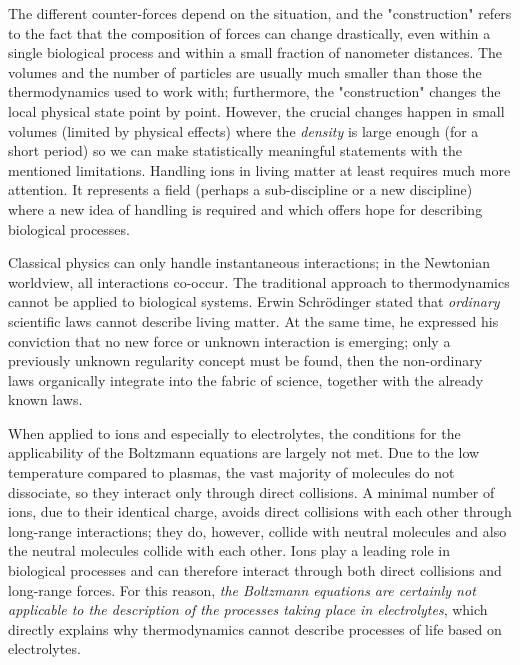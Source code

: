 The different counter-forces depend on the situation, and the "construction" refers to the fact that the composition of forces can change drastically, even within a single biological process
and within a small fraction of nanometer distances. 
The volumes and the  number of particles 
are usually much smaller than those the thermodynamics used to work with; furthermore, the "construction" changes the local physical state point by point. However, the crucial changes happen in small volumes (limited by physical effects) where the \textit{density} is large enough (for a short period)
so we can make
statistically meaningful statements with the mentioned limitations. Handling ions in living matter at least requires much more 
attention. It represents a field (perhaps a sub-discipline or a new discipline) where a new idea of handling is required and which offers hope for describing biological processes.


Classical physics can only handle instantaneous interactions; in the Newtonian worldview, all interactions co-occur. The traditional approach to thermodynamics cannot be applied to biological systems. Erwin Schrödinger stated that \textit{ordinary} scientific laws cannot describe living matter. At the same time, he expressed his conviction that no new force or unknown interaction is emerging; only a previously unknown regularity concept must be found, then the \hypertarget{NonOrdinaryLaws}{non-ordinary laws} organically integrate into the fabric of science, together with the already known laws.

When applied to ions and especially to electrolytes, the conditions for the applicability of the Boltzmann equations are largely not met. Due to the low temperature compared to plasmas, the vast majority of molecules do not dissociate, so they interact only through direct collisions. A minimal number of ions, due to their identical charge, avoids direct collisions with each other through long-range interactions; they do, however, collide with neutral molecules and also the neutral molecules collide with each other. Ions play a leading role in biological processes and can therefore interact through both direct collisions and long-range forces. For this reason, \textit{the Boltzmann equations are certainly not applicable to the description of the processes taking place in electrolytes}, which directly explains why thermodynamics cannot describe processes of life based on electrolytes.

